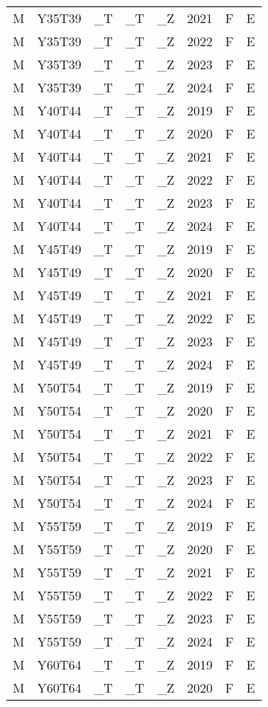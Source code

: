 \begin{longtable}[t]{llllllll}
M & Y35T39 & \_T & \_T & \_Z & 2021 & F & E\\
M & Y35T39 & \_T & \_T & \_Z & 2022 & F & E\\
M & Y35T39 & \_T & \_T & \_Z & 2023 & F & E\\
M & Y35T39 & \_T & \_T & \_Z & 2024 & F & E\\
\addlinespace
M & Y40T44 & \_T & \_T & \_Z & 2019 & F & E\\
M & Y40T44 & \_T & \_T & \_Z & 2020 & F & E\\
M & Y40T44 & \_T & \_T & \_Z & 2021 & F & E\\
M & Y40T44 & \_T & \_T & \_Z & 2022 & F & E\\
M & Y40T44 & \_T & \_T & \_Z & 2023 & F & E\\
\addlinespace
M & Y40T44 & \_T & \_T & \_Z & 2024 & F & E\\
M & Y45T49 & \_T & \_T & \_Z & 2019 & F & E\\
M & Y45T49 & \_T & \_T & \_Z & 2020 & F & E\\
M & Y45T49 & \_T & \_T & \_Z & 2021 & F & E\\
M & Y45T49 & \_T & \_T & \_Z & 2022 & F & E\\
\addlinespace
M & Y45T49 & \_T & \_T & \_Z & 2023 & F & E\\
M & Y45T49 & \_T & \_T & \_Z & 2024 & F & E\\
M & Y50T54 & \_T & \_T & \_Z & 2019 & F & E\\
M & Y50T54 & \_T & \_T & \_Z & 2020 & F & E\\
M & Y50T54 & \_T & \_T & \_Z & 2021 & F & E\\
\addlinespace
M & Y50T54 & \_T & \_T & \_Z & 2022 & F & E\\
M & Y50T54 & \_T & \_T & \_Z & 2023 & F & E\\
M & Y50T54 & \_T & \_T & \_Z & 2024 & F & E\\
M & Y55T59 & \_T & \_T & \_Z & 2019 & F & E\\
M & Y55T59 & \_T & \_T & \_Z & 2020 & F & E\\
\addlinespace
M & Y55T59 & \_T & \_T & \_Z & 2021 & F & E\\
M & Y55T59 & \_T & \_T & \_Z & 2022 & F & E\\
M & Y55T59 & \_T & \_T & \_Z & 2023 & F & E\\
M & Y55T59 & \_T & \_T & \_Z & 2024 & F & E\\
M & Y60T64 & \_T & \_T & \_Z & 2019 & F & E\\
\addlinespace
M & Y60T64 & \_T & \_T & \_Z & 2020 & F & E\\

\end{longtable}
